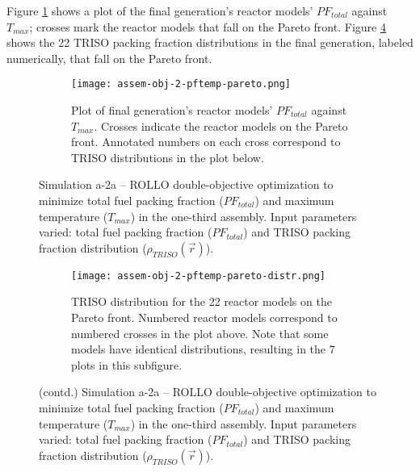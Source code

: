 Figure \ref{fig:assem-obj-2-pftemp-pareto} shows a plot of the final generation's 
reactor models' $PF_{total}$ against $T_{max}$; crosses mark the reactor models 
that fall on the Pareto front.
Figure \ref{fig:assem-obj-2-pftemp-pareto-distr} shows the 22 TRISO packing fraction 
distributions in the final generation, labeled numerically, that fall on the 
Pareto front. 
\begin{figure}[htbp!]
    \begin{subfigure}{\textwidth}
        \centering
        \texttt{[image: assem-obj-2-pftemp-pareto.png]}
        \caption{Plot of final generation's reactor models' $PF_{total}$ against 
        $T_{max}$. 
        Crosses indicate the reactor models on the Pareto front. Annotated numbers 
        on each cross correspond to TRISO distributions in the plot below.}
        \label{fig:assem-obj-2-pftemp-pareto} 
    \end{subfigure}
    \caption{Simulation a-2a -- ROLLO double-objective optimization to minimize total fuel 
    packing fraction ($PF_{total}$) and maximum temperature ($T_{max}$) in 
    the one-third assembly. 
    Input parameters varied: total fuel packing fraction ($PF_{total}$) and TRISO 
    packing fraction distribution ($\rho_{TRISO}(\vec{r})$).}
    \label{fig:assem-obj-2-pftemp}
\end{figure}
\begin{figure}[htbp!]
    \ContinuedFloat
    \begin{subfigure}{\textwidth}
        \centering
        \texttt{[image: assem-obj-2-pftemp-pareto-distr.png]}
        \caption{TRISO distribution for the 22 reactor models on the Pareto front.
        Numbered reactor models correspond to numbered crosses in the plot above. 
        Note that some models have identical distributions, resulting in the 7 plots in 
        this subfigure.}
        \label{fig:assem-obj-2-pftemp-pareto-distr} 
    \end{subfigure}
    \caption{(contd.) Simulation a-2a -- ROLLO double-objective optimization to minimize total fuel 
    packing fraction ($PF_{total}$) and maximum temperature ($T_{max}$) in 
    the one-third assembly. 
    Input parameters varied: total fuel packing fraction ($PF_{total}$) and TRISO 
    packing fraction distribution ($\rho_{TRISO}(\vec{r})$).}
\end{figure}

